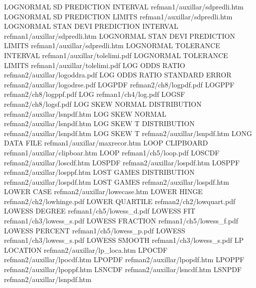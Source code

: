 LOGNORMAL SD PREDICTION INTERVAL        refman1/auxillar/sdpredli.htm
LOGNORMAL SD PREDICTION LIMITS          refman1/auxillar/sdpredli.htm
LOGNORMAL STAN DEVI PREDICTION INTERVAL refman1/auxillar/sdpredli.htm
LOGNORMAL STAN DEVI PREDICTION LIMITS   refman1/auxillar/sdpredli.htm
LOGNORMAL TOLERANCE INTERVAL            refman1/auxillar/tolelimi.pdf
LOGNORMAL TOLERANCE LIMITS              refman1/auxillar/tolelimi.pdf
LOG ODDS RATIO                          refman2/auxillar/logoddra.pdf
LOG ODDS RATIO STANDARD ERROR           refman2/auxillar/logodrse.pdf
LOGPDF                                  refman2/ch8/logpdf.pdf
LOGPPF                                  refman2/ch8/logppf.pdf
LOG                                     refman1/ch4/log.pdf
LOGSF                                   refman2/ch8/logsf.pdf
LOG SKEW NORMAL DISTRIBUTION            refman2/auxillar/lsnpdf.htm
LOG SKEW NORMAL                         refman2/auxillar/lsnpdf.htm
LOG SKEW T DISTRIBUTION                 refman2/auxillar/lsnpdf.htm
LOG SKEW T                              refman2/auxillar/lsnpdf.htm
LONG DATA FILE                          refman1/auxillar/maxrecor.htm
LOOP CLIPBOARD                          refman1/auxillar/clipboar.htm
LOOP                                    refman1/ch5/loop.pdf
LOSCDF                                  refman2/auxillar/loscdf.htm
LOSPDF                                  refman2/auxillar/lospdf.htm
LOSPPF                                  refman2/auxillar/losppf.htm
LOST GAMES DISTRIBUTION                 refman2/auxillar/lospdf.htm
LOST GAMES                              refman2/auxillar/lospdf.htm
LOWER CASE                              refman2/auxillar/lowecase.htm
LOWER HINGE                             refman2/ch2/lowhinge.pdf
LOWER QUARTILE                          refman2/ch2/lowquart.pdf
LOWESS DEGREE                           refman1/ch5/lowess_d.pdf
LOWESS FIT                              refman1/ch3/lowess_s.pdf
LOWESS FRACTION                         refman1/ch5/lowess_f.pdf
LOWESS PERCENT                          refman1/ch5/lowess_p.pdf
LOWESS                                  refman1/ch3/lowess_s.pdf
LOWESS SMOOTH                           refman1/ch3/lowess_s.pdf
LP LOCATION                             refman2/auxillar/lp_loca.htm
LPOCDF                                  refman2/auxillar/lpocdf.htm
LPOPDF                                  refman2/auxillar/lpopdf.htm
LPOPPF                                  refman2/auxillar/lpoppf.htm
LSNCDF                                  refman2/auxillar/lsncdf.htm
LSNPDF                                  refman2/auxillar/lsnpdf.htm
